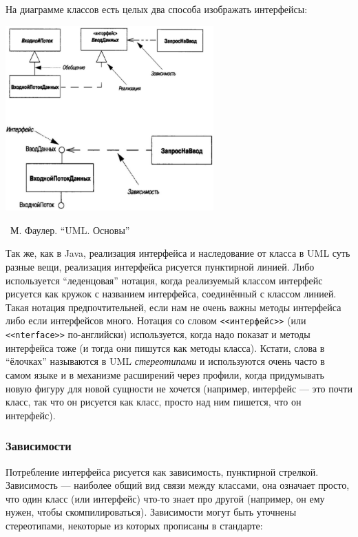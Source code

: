 \documentclass[a5paper]{article}
\newcommand{\attribution}[1] {
	\vspace{-5mm}\begin{flushright}\begin{scriptsize}%
	{\textcopyright\, #1}\end{scriptsize}\end{flushright}
}
\begin{document}
На диаграмме классов есть целых два способа изображать интерфейсы: 

\begin{center}
	\includegraphics[width=0.6\textwidth]{interfaces.png}
	\attribution{М. Фаулер. ``UML. Основы''}
\end{center}

Так же, как в Java, реализация интерфейса и наследование от класса в UML суть разные вещи, реализация интерфейса рисуется пунктирной линией. Либо используется ``леденцовая'' нотация, когда реализуемый классом интерфейс рисуется как кружок с названием интерфейса, соединённый с классом линией. Такая нотация предпочтительней, если нам не очень важны методы интерфейса либо если интерфейсов много. Нотация со словом \verb|<<интерфейс>>| (или \verb|<<nterface>>| по-английски) используется, когда надо показат и методы интерфейса тоже (и тогда они пишутся как методы класса). Кстати, слова в ``ёлочках'' называются в UML \textit{стереотипами} и используются очень часто в самом языке и в механизме расширений через профили, когда придумывать новую фигуру для новой сущности не хочется (например, интерфейс --- это почти класс, так что он рисуется как класс, просто над ним пишется, что он интерфейс).

\subsubsection{Зависимости}

Потребление интерфейса рисуется как зависимость, пунктирной стрелкой. Зависимость --- наиболее общий вид связи между классами, она означает просто, что один класс (или интерфейс) что-то знает про другой (например, он ему нужен, чтобы скомпилироваться). Зависимости могут быть уточнены стереотипами, некоторые из которых прописаны в стандарте:
\end{document}
